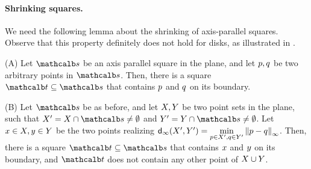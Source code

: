 \documentclass[12pt]{article}%
\begin{document}
\paragraph{Shrinking squares.}
We need the following lemma about the shrinking of axis-parallel
squares.  Observe that this property definitely does not hold for
disks, as illustrated in .

\begin{lemma}
    (A) Let $\sqr$ be an axis parallel square in the plane, and let
    $p, q$ be two arbitrary points in $\sqr$. Then, there is a
    square $\sqrA \subseteq \sqr$ that contains $p$ and $q$ on its
    boundary.

    (B) Let $\sqr$ be as before, and let $X, Y$ be two point
    sets in the plane, such that
    $\PSX' = \PSX \cap \sqr \neq \emptyset$ and
    $\PSY' = \PSY \cap \sqr \neq \emptyset$. Let
    $x \in X, y \in Y$ be the two points realizing
    $\dsZ{\infty}{\PSX'}{\PSY'} = \underset{\pa \in \PSX', \pb \in
       \PSY'}{\min} \dZ{\infty}{\pa}{\pb}$. Then, there is a square
    $\sqrA \subseteq \sqr$ that contains $x$ and $y$ on its
    boundary, and $\sqrA$ does not contain any other point of
    $X \cup Y$.
\end{lemma}
\end{document}

